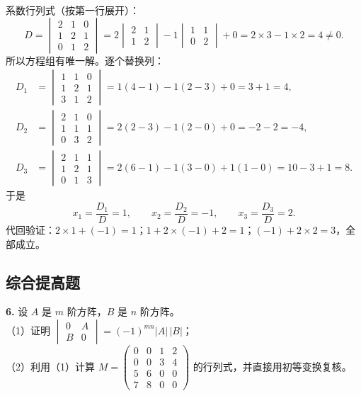 系数行列式（按第一行展开）：
\[
D=\begin{vmatrix}
2&1&0\\
1&2&1\\
0&1&2
\end{vmatrix}
=2\begin{vmatrix}2&1\\1&2\end{vmatrix}-1\begin{vmatrix}1&1\\0&2\end{vmatrix}+0
=2\times3-1\times2=4\neq0.
\]
所以方程组有唯一解。逐个替换列：
\[
\begin{aligned}
D_1&=\begin{vmatrix}1&1&0\\1&2&1\\3&1&2\end{vmatrix}
=1(4-1)-1(2-3)+0=3+1=4,\\
D_2&=\begin{vmatrix}2&1&0\\1&1&1\\0&3&2\end{vmatrix}
=2(2-3)-1(2-0)+0=-2-2=-4,\\
D_3&=\begin{vmatrix}2&1&1\\1&2&1\\0&1&3\end{vmatrix}
=2(6-1)-1(3-0)+1(1-0)=10-3+1=8.
\end{aligned}
\]
于是
\[
x_1=\frac{D_1}{D}=1,\qquad x_2=\frac{D_2}{D}=-1,\qquad x_3=\frac{D_3}{D}=2.
\]
代回验证：$2\times1+(-1)=1$；$1+2\times(-1)+2=1$；$(-1)+2\times2=3$，全部成立。


\else \answerarea[8] \fi%

\subsection{综合提高题}

\textbf{6.} 设 $A$ 是 $m$ 阶方阵，$B$ 是 $n$ 阶方阵。\\[2pt]
（1）证明 $\begin{vmatrix}0&A\\B&0\end{vmatrix}=(-1)^{mn}|A|\,|B|$；\\[2pt]
（2）利用（1）计算 $M=\begin{pmatrix}0&0&1&2\\0&0&3&4\\5&6&0&0\\7&8&0&0\end{pmatrix}$ 的行列式，并直接用初等变换复核。

